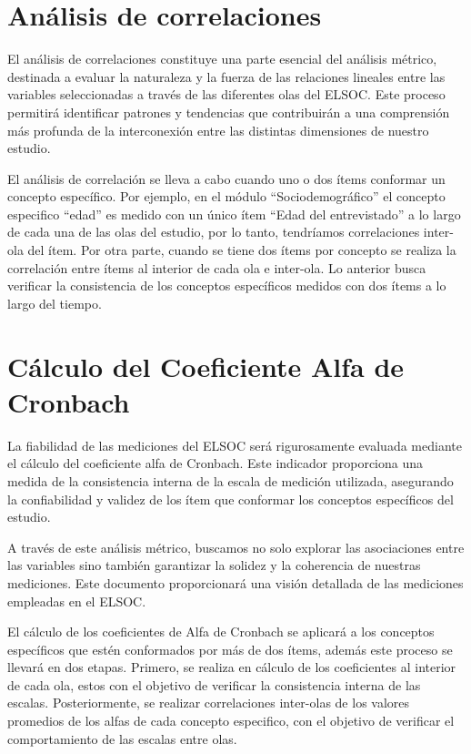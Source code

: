 \documentclass[
  12pt,
]{book}
\begin{document}
\hypertarget{anuxe1lisis-de-correlaciones}{%
\section*{Análisis de correlaciones}\label{anuxe1lisis-de-correlaciones}}

El análisis de correlaciones constituye una parte esencial del análisis métrico, destinada a evaluar la naturaleza y la fuerza de las relaciones lineales entre las variables seleccionadas a través de las diferentes olas del ELSOC. Este proceso permitirá identificar patrones y tendencias que contribuirán a una comprensión más profunda de la interconexión entre las distintas dimensiones de nuestro estudio.

El análisis de correlación se lleva a cabo cuando uno o dos ítems conformar un concepto específico. Por ejemplo, en el módulo ``Sociodemográfico'' el concepto especifico ``edad'' es medido con un único ítem ``Edad del entrevistado'' a lo largo de cada una de las olas del estudio, por lo tanto, tendríamos correlaciones inter-ola del ítem. Por otra parte, cuando se tiene dos ítems por concepto se realiza la correlación entre ítems al interior de cada ola e inter-ola. Lo anterior busca verificar la consistencia de los conceptos específicos medidos con dos ítems a lo largo del tiempo.

\hypertarget{cuxe1lculo-del-coeficiente-alfa-de-cronbach}{%
\section*{Cálculo del Coeficiente Alfa de Cronbach}\label{cuxe1lculo-del-coeficiente-alfa-de-cronbach}}

La fiabilidad de las mediciones del ELSOC será rigurosamente evaluada mediante el cálculo del coeficiente alfa de Cronbach. Este indicador proporciona una medida de la consistencia interna de la escala de medición utilizada, asegurando la confiabilidad y validez de los ítem que conformar los conceptos específicos del estudio.

A través de este análisis métrico, buscamos no solo explorar las asociaciones entre las variables sino también garantizar la solidez y la coherencia de nuestras mediciones. Este documento proporcionará una visión detallada de las mediciones empleadas en el ELSOC.

El cálculo de los coeficientes de Alfa de Cronbach se aplicará a los conceptos específicos que estén conformados por más de dos ítems, además este proceso se llevará en dos etapas. Primero, se realiza en cálculo de los coeficientes al interior de cada ola, estos con el objetivo de verificar la consistencia interna de las escalas. Posteriormente, se realizar correlaciones inter-olas de los valores promedios de los alfas de cada concepto especifico, con el objetivo de verificar el comportamiento de las escalas entre olas.
\end{document}

